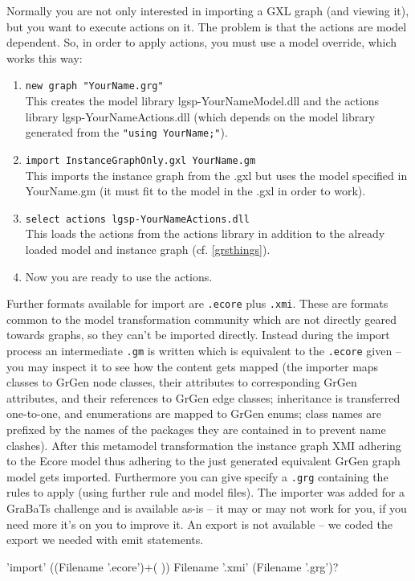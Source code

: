 \begin{note}\label{shellgxlimport}
Normally you are not only interested in importing a GXL graph (and viewing it), but you want to execute actions on it.
The problem is that the actions are model dependent.
So, in order to apply actions, you must use a model override, which works this way:
\begin{enumerate}
\item \texttt{new graph "YourName.grg"}\\
This creates the model library lgsp-YourNameModel.dll
and the actions library lgsp-YourNameActions.dll
(which depends on the model library generated from the \texttt{"using YourName;"}).
\item \texttt{import InstanceGraphOnly.gxl YourName.gm}\\
This imports the instance graph from the .gxl but uses the model specified
in YourName.gm (it must fit to the model in the .gxl in order to work).
\item \texttt{select actions lgsp-YourNameActions.dll}\\
This loads the actions from the actions library in addition to the already
loaded model and instance graph (cf. \ref{grsthings}).
\item Now you are ready to use the actions.
\end{enumerate}
\end{note}

\begin{note}\label{shellecoreexport}
Further formats available for import are \texttt{.ecore} plus \texttt{.xmi}.
These are formats common to the model transformation community which are not directly geared towards graphs, so they can't be imported directly.
Instead during the import process an intermediate \texttt{.gm} is written which is equivalent to the \texttt{.ecore} given -- you may inspect it to see how the content gets mapped
(the importer maps classes to GrGen node classes, their attributes
to corresponding GrGen attributes, and their references to GrGen
edge classes; inheritance is transferred one-to-one, and enumerations are
mapped to GrGen enums; class names are prefixed by the names of the
packages they are contained in to prevent name clashes).
After this metamodel transformation the instance graph XMI adhering to the Ecore model thus adhering to the just
generated equivalent GrGen graph model gets imported.
Furthermore you can give specify a \texttt{.grg} containing the rules to apply (using further rule and model files).
The importer was added for a GraBaTs challenge and is available as-is -- it may or may not work for you, 
if you need more it's on you to improve it. An export is not available -- we coded the export we needed with emit statements.
\begin{rail}
  'import' ((Filename '.ecore')+( )) Filename '.xmi' (Filename '.grg')?
\end{rail}
\end{note}

